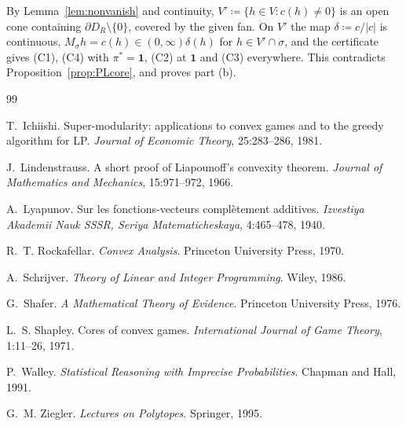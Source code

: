 \documentclass[11pt]{article}
\newcommand{\one}{\mathbf{1}}
\theoremstyle{plain}
\theoremstyle{definition}
\theoremstyle{remark}
\begin{document}
By Lemma~\ref{lem:nonvanish} and continuity, $V'\coloneqq\{h\in V:c(h)\ne0\}$ is an open
cone containing $\partial D_R\setminus\{0\}$, covered by the given fan. On $V'$ the map
$\delta\coloneqq c/|c|$ is continuous, $M_\sigma h=c(h)\in(0,\infty)\delta(h)$ for $h\in
V'\cap\sigma$, and the certificate gives (C1), (C4) with $\pi^\ast=\one$, (C2) at $\one$
and (C3) everywhere. This contradicts Proposition~\ref{prop:PLcore}, and proves part (b).

\begin{thebibliography}{99}

T.~Ichiishi.
\newblock Super-modularity: applications to convex games and to the greedy algorithm
for {LP}.
\newblock \emph{Journal of Economic Theory}, 25:283--286, 1981.

J.~Lindenstrauss.
\newblock A short proof of {L}iapounoff's convexity theorem.
\newblock \emph{Journal of Mathematics and Mechanics}, 15:971--972, 1966.

A.~Lyapunov.
\newblock Sur les fonctions-vecteurs compl\`etement additives.
\newblock \emph{Izvestiya Akademii Nauk SSSR, Seriya Matematicheskaya}, 4:465--478,
1940.

R.~T. Rockafellar.
\newblock \emph{Convex Analysis}.
\newblock Princeton University Press, 1970.

A.~Schrijver.
\newblock \emph{Theory of Linear and Integer Programming}.
\newblock Wiley, 1986.

G.~Shafer.
\newblock \emph{A Mathematical Theory of Evidence}.
\newblock Princeton University Press, 1976.

L.~S. Shapley.
\newblock Cores of convex games.
\newblock \emph{International Journal of Game Theory}, 1:11--26, 1971.

P.~Walley.
\newblock \emph{Statistical Reasoning with Imprecise Probabilities}.
\newblock Chapman and Hall, 1991.

G.~M. Ziegler.
\newblock \emph{Lectures on Polytopes}.
\newblock Springer, 1995.

\end{thebibliography}
\end{document}
